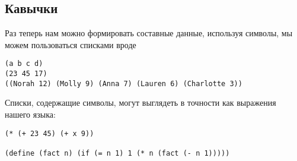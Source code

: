 \subsection{Кавычки}
\label{QUOTATION}

Раз теперь нам можно формировать составные данные,
используя символы, мы можем пользоваться списками вроде

\begin{Verbatim}[fontsize=\small]
(a b c d)
(23 45 17)
((Norah 12) (Molly 9) (Anna 7) (Lauren 6) (Charlotte 3))
\end{Verbatim}
Списки, содержащие символы, могут выглядеть в точности как выражения
нашего языка:

\begin{Verbatim}[fontsize=\small]
(* (+ 23 45) (+ x 9))

(define (fact n) (if (= n 1) 1 (* n (fact (- n 1)))))
\end{Verbatim}

